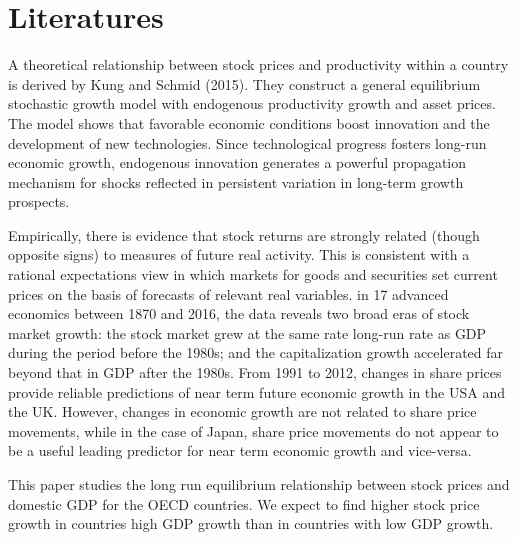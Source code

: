 \documentclass[../main.tex]{subfiles}
\begin{document}
\section{Literatures}

A theoretical relationship between stock prices and productivity within a country is derived by Kung and Schmid (2015)\cite{Kung2015}. They construct a general equilibrium stochastic growth model with endogenous productivity growth and asset prices. The model shows that favorable economic conditions boost innovation and the development of new technologies. Since technological progress fosters long-run economic growth, endogenous innovation generates a powerful propagation mechanism for shocks reflected in persistent variation in long-term growth prospects.

Empirically, there is evidence that stock returns are strongly related (though opposite signs) to measures of future real activity\cite{Fama1981}. This is consistent with a rational expectations view in which markets for goods and securities set current prices on the basis of forecasts of relevant real variables. in 17 advanced economics between 1870 and 2016, the data reveals two broad eras of stock market growth: the stock market grew at the same rate long-run rate as GDP during the period before the 1980s; and the capitalization growth accelerated far beyond that in GDP after the 1980s\cite{KUVSHINOV2022}. From 1991 to 2012, changes in share prices provide reliable predictions of near term future economic growth in the USA and the UK. However, changes in economic growth are not related to share price movements, while in the case of Japan, share price movements do not appear to be a useful leading predictor for near term economic growth and vice-versa\cite{Hossain2015}.

This paper studies the long run equilibrium relationship between stock prices and domestic GDP for the OECD countries. We expect to find higher stock price growth in countries high GDP growth than in countries with low GDP growth.
\end{document}
